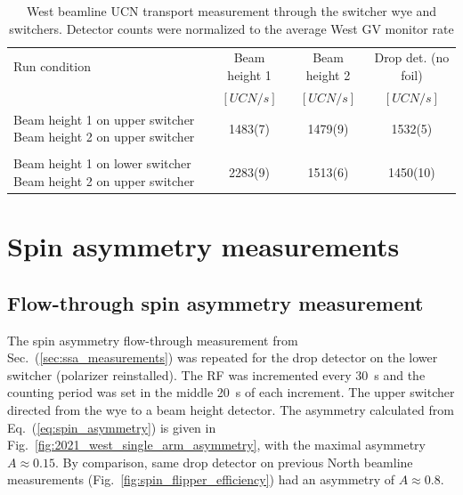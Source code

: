\begin{table}
    \centering
    \caption{West beamline UCN transport measurement through the switcher wye and switchers. Detector counts were normalized to the average West GV monitor rate}\label{tb:2021_transport}
    \begin{tabular}{
        p{2in} 
        c
        c
        c
    }
    \toprule
        {Run condition} & {Beam height 1} & {Beam height 2} &{Drop det. (no foil)} \\
        & {$[\unit{UCN\per s}]$} & {$[\unit{UCN\per s}]$} & {$[\unit{UCN\per s}]$}\\
    \midrule
        {\small Beam height 1 on upper switcher Beam height 2 on upper switcher} &  1483(7) & 1479(9) & 1532(5)\\
        \\
        {\small Beam height 1 on lower switcher Beam height 2 on upper switcher} &  2283(9) & 1513(6) & 1450(10)\\
    \bottomrule
    \end{tabular}
\end{table}


\section{Spin asymmetry measurements}\label{sec:asymmetry_west_2021}



\subsection{Flow-through spin asymmetry measurement}\label{sec:single_arm_flow_through_west_2021}


The spin asymmetry flow-through measurement from Sec.~(\ref{sec:ssa_measurements}) was repeated for the drop detector on the lower switcher (polarizer reinstalled). The RF was incremented every \qty{30}{s} and the counting period was set in the middle \qty{20}{s} of each increment.  The upper switcher directed \ucn from the wye to a beam height detector. The asymmetry calculated from Eq.~(\ref{eq:spin_asymmetry}) is given in Fig.~\ref{fig:2021_west_single_arm_asymmetry}, with the maximal asymmetry $A\approx 0.15$. By comparison, same drop detector on previous North beamline measurements (Fig.~\ref{fig:spin_flipper_efficiency}) had an asymmetry of $A\approx 0.8$.

